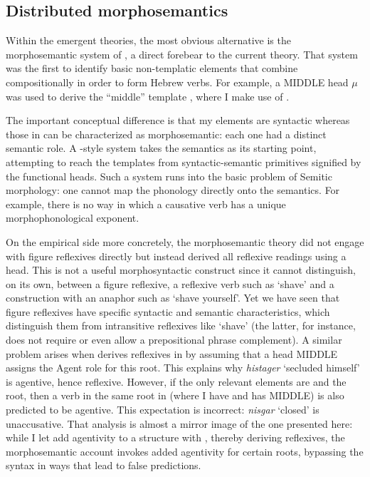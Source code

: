 {	\subsection{Distributed morphosemantics \citep{doron03}} \label{vz:others:ed}
Within the emergent theories, the most obvious alternative is the morphosemantic system of \cite{doron03}, a direct forebear to the current theory. That system was the first to identify basic non-templatic elements that combine compositionally in order to form Hebrew verbs. For example, a MIDDLE head $\mu$ was used to derive the ``middle'' template {\tnif}, where I make use of {\vz}.

The important conceptual difference is that my elements are syntactic whereas those in \cite{doron03} can be characterized as morphosemantic: each one had a distinct semantic role. A \citeauthor{doron03}-style system takes the semantics as its starting point, attempting to reach the templates from syntactic-semantic primitives signified by the functional heads. Such a system runs into the basic problem of Semitic morphology: one cannot map the phonology directly onto the semantics. For example, there is no way in which a causative verb has a unique morphophonological exponent.

On the empirical side more concretely, the morphosemantic theory did not engage with figure reflexives directly but instead derived all reflexive readings using a  head. This is not a useful morphosyntactic construct since it cannot distinguish, on its own, between a figure reflexive, a reflexive verb such as `shave’ and a construction with an anaphor such as `shave yourself’. Yet we have seen that figure reflexives have specific syntactic and semantic characteristics, which distinguish them from intransitive reflexives like `shave’ (the latter, for instance, does not require or even allow a prepositional phrase complement). A similar problem arises when \citet[60]{doron03} derives reflexives in {\thit} by assuming that a head MIDDLE assigns the Agent role for this root. This explains why \emph{histager} `secluded himself' is agentive, hence reflexive. However, if the only relevant elements are {\vz} and the root, then a verb in the same root in {\tnif} (where I have {\vz} and \citealt{doron03} has MIDDLE) is also predicted to be agentive. This expectation is incorrect: \emph{nisgar} `closed' is unaccusative. That analysis is almost a mirror image of the one presented here: while I let {\va} add agentivity to a structure with \vz, thereby deriving reflexives, the morphosemantic account invokes added agentivity for certain roots, bypassing the syntax in ways that lead to false predictions.

}
